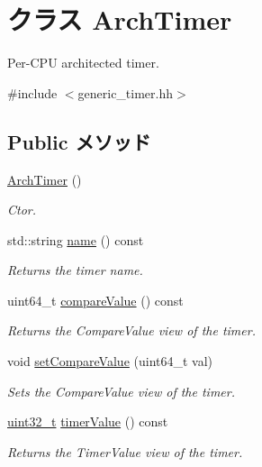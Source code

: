 \hypertarget{classGenericTimer_1_1ArchTimer}{
\section{クラス ArchTimer}
\label{classGenericTimer_1_1ArchTimer}
}


Per-\/CPU architected timer.  


{\ttfamily \#include $<$generic\_\-timer.hh$>$}\subsection*{Public メソッド}
\begin{DoxyCompactItemize}
\item 
\hyperlink{classGenericTimer_1_1ArchTimer_a8b96adab98c203cf9238b92cd1376ef5}{ArchTimer} ()
\begin{DoxyCompactList}\small\item\em Ctor. \item\end{DoxyCompactList}\item 
std::string \hyperlink{classGenericTimer_1_1ArchTimer_a37627d5d5bba7f4a8690c71c2ab3cb07}{name} () const 
\begin{DoxyCompactList}\small\item\em Returns the timer name. \item\end{DoxyCompactList}\item 
uint64\_\-t \hyperlink{classGenericTimer_1_1ArchTimer_a695f6515c1ffd9033de3acdde32f5bce}{compareValue} () const 
\begin{DoxyCompactList}\small\item\em Returns the CompareValue view of the timer. \item\end{DoxyCompactList}\item 
void \hyperlink{classGenericTimer_1_1ArchTimer_aa636bac63879171a06c4b39782c84e66}{setCompareValue} (uint64\_\-t val)
\begin{DoxyCompactList}\small\item\em Sets the CompareValue view of the timer. \item\end{DoxyCompactList}\item 
\hyperlink{Type_8hh_a435d1572bf3f880d55459d9805097f62}{uint32\_\-t} \hyperlink{classGenericTimer_1_1ArchTimer_a5bd6c4174ad5bdcd52b55f1da765218e}{timerValue} () const 
\begin{DoxyCompactList}\small\item\em Returns the TimerValue view of the timer. \item\end{DoxyCompactList}\item 

\end{DoxyCompactItemize}
